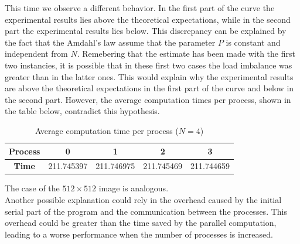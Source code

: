 \begin{figure}[H]
{
        }
    \end{figure}
    This time we observe a different behavior. In the first part of the
    curve the experimental results lies above the theoretical expectations,
    while in the second part the experimental results lies below. This
    discrepancy can be explained by the fact that the Amdahl's law assume
    that the parameter $P$ is constant and independent from $N$.
    Remebering that the estimate has been made with the first two instancies,
    it is possible that in these first two cases the load imbalance was
    greater than in the latter ones. This would explain why the experimental
    results are above the theoretical expectations in the first part of the
    curve and below in the second part. However, the average computation times
    per process, shown in the table below, contradict this hypothesis.
    \begin{table}[H]
        \centering
        \begin{tabular}{|c|c|c|c|c|}
        \hline
        \textbf{Process} & 0 & 1 & 2 & 3 \\ \hline
        \textbf{Time} & 211.745397 & 211.746975 & 211.745469 & 211.744659 \\ \hline
        \end{tabular}
        \caption{Average computation time per process ($N=4$)}
        \label{table:transposed_values}
    \end{table}
    The case of the $512 \times 512$ image is analogous. \\
    Another possible explanation could rely in the overhead caused by the 
    initial serial part of the program and the communication between the
    processes. This overhead could be greater than the time saved by the
    parallel computation, leading to a worse performance when the number
    of processes is increased.

